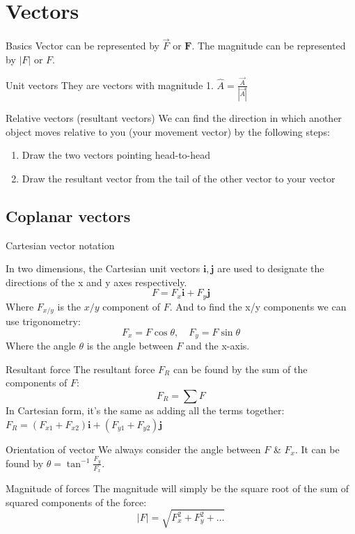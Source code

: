 
\section{Vectors}

\begin{definition}[]{Basics}
    Vector can be represented by $\vec{F}$ or $\boldsymbol{F}$. The magnitude can be represented by $|F|$ or $F$.
\end{definition}

\begin{knBox}[]{Unit vectors}
    They are vectors with magnitude 1. $\hat{A}=\frac{\vec{A}}{|\vec{A}|}$
\end{knBox}
\begin{knBox}
    {Relative vectors (resultant vectors)}
    We can find the direction in which another object moves relative to you (your movement vector) by the following steps:
    \begin{enumerate}
        \item Draw the two vectors pointing head-to-head
        \item Draw the resultant vector from the tail of the other vector to your vector
    \end{enumerate}
\end{knBox}

\subsection{Coplanar vectors}
\begin{definition}
    {Cartesian vector notation}

    In two dimensions, the Cartesian unit vectors $\boldsymbol{i}, \boldsymbol{j}$ are used to designate the directions of the x and y axes respectively.
    \[F=F_x \boldsymbol{i} + F_y \boldsymbol{j}\]
    Where $F_{x/y}$ is the $x/y$ component of $F$. And to find the x/y components we can use trigonometry:
    \[F_x=F\cos{\theta},\quad F_y=F\sin{\theta}\]
    Where the angle $\theta$ is the angle between $F$ and the x-axis.
\end{definition}

\begin{knBox}
    {Resultant force}
    The resultant force $F_R$ can be found by the sum of the components of $F$:
    \[F_R=\sum F\]
    In Cartesian form, it's the same as adding all the terms together: $F_R=(F_{x1}+F_{x2})\boldsymbol{i}+(F_{y1}+F_{y2})\boldsymbol{j}$
\end{knBox}
\begin{knBox}
    {Orientation of vector}
    We always consider the angle between $F$ \& $F_x$. It can be found by $\theta=\tan^{-1}\frac{F_y}{F_x}$.
\end{knBox}
\begin{knBox}
    {Magnitude of forces}
    The magnitude will simply be the square root of the sum of squared components of the force:
    \[|F|=\sqrt{F_x^2+F_y^2+\dots}\]
\end{knBox}

